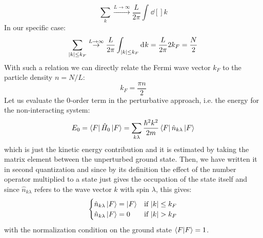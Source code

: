 \documentclass[11pt, a4paper, twoside, openright]{article}
\begin{document}
\begin{itemize}
\begin{equation}
  \sum_{ k }^{}
  \overset{L \rightarrow \infty }{\rightarrow  } \frac{L}{2 \pi } \int_{}^{} \dd[]{k}
\end{equation}
In our specific case:
\begin{equation*}
  \sum_{\abs{k}  \le k_F }^{}   \overset{L \rightarrow \infty }{\rightarrow  }
  \frac{L}{2 \pi} \int_{\abs{k}  \le k_F}^{} \dd[]{k}
  = \frac{L}{2 \pi} 2 k_F = \frac{N}{2}
\end{equation*}
With such a relation we can directly relate the Fermi wave vector \( k_F \) to the particle density \( n=N/L \):
\begin{equation*}
  k_F = \frac{\pi n}{2}
\end{equation*}
Let us evaluate the 0-order term in the perturbative approach, i.e. the energy for the non-interacting system:
\begin{equation*}
  E_0 = \bra{F} \hat{H}_0 \ket{F} = \sum_{k\lambda }^{} \frac{\hbar ^2 k^2}{2m }     \bra{F} \hat{n}_{k\lambda } \ket{F}
\end{equation*}
which is just the kinetic energy contribution and it is estimated by taking the matrix element between the unperturbed ground state.
Then, we have written it in second quantization and since by its definition the effect of the number operator multiplied to a state just gives the occupation of the state itself and  since  \( \hat{n}_{k \lambda }  \) refers to the wave vector \( k \) with spin \( \lambda  \), this gives:
\begin{equation*}
  \begin{cases}
   \hat{n}_{k \lambda } \ket{F} = \ket{F} & \text{if } \abs{k} \le k_F  \\
  \hat{n}_{k \lambda } \ket{F} = 0  & \text{if } \abs{k} > k_F
  \end{cases}
\end{equation*}
with the normalization condition on the ground state \(  \braket{F}{F}=1   \).



\end{itemize}
\end{document}
